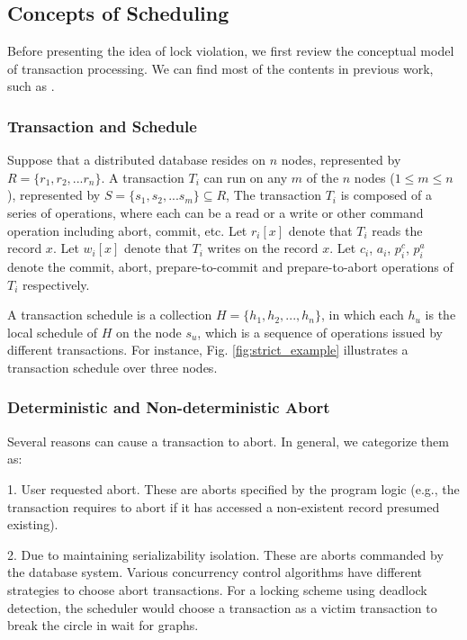 \documentclass[conference]{IEEEtran}
\begin{document}
\subsection{Concepts of Scheduling}
Before presenting the idea of lock violation, we first review the conceptual model of transaction processing. 
We can find most of the contents in previous work, such as \cite{LockNoWait:journals/csur/BernsteinG81}.

\subsubsection{Transaction and Schedule}
Suppose that a distributed database resides on ${n}$ nodes, represented by ${R = \{r_1, r_2, ... r_n\}}$.
A transaction ${T_i}$ can run on any ${m}$ of the ${n}$ nodes ($1 \le m \le n$), represented by  ${S = \{s_1, s_2, ... s_m\} \subseteq R}$,
The transaction ${T_i}$ is composed of a series of operations, 
where each can be a read or a write or other command operation including abort, commit, etc.
Let ${r_i[x]}$ denote that ${T_i}$ reads the record ${x}$. Let ${w_i[x]}$ denote that ${T_i}$ writes on the record ${x}$.
Let ${c_i}$, ${a_i}$, ${p^c_i}$, ${p^a_i}$ denote the commit, abort, prepare-to-commit and prepare-to-abort operations of ${T_i}$ respectively.


A transaction schedule is a collection ${H = \{h_1, h_2, ..., h_n\}}$, in which
each ${h_u}$ is the local schedule of $H$ on the node ${s_u}$, which is a sequence of operations issued by different transactions.
For instance, Fig. \ref{fig:strict_example} illustrates a transaction schedule over three nodes.

\subsubsection{Deterministic and Non-deterministic Abort}

Several reasons can cause a transaction to abort. In general, we categorize them as:

1. User requested abort. 
These are aborts specified by the program logic (e.g., the transaction requires to abort if it has accessed a non-existent record presumed existing).

2. Due to maintaining serializability isolation. 
These are aborts commanded by the database system.
Various concurrency control algorithms have different strategies to choose abort transactions.
For a locking scheme using deadlock detection,
the scheduler would choose a transaction as a victim transaction to break the circle in wait for graphs.
\end{document}
